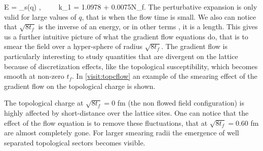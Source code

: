 \beq
    \langle E \rangle =  \alpha_s(q) ,~~~~~k_1 = 1.0978 + 0.0075\times N_f.
    \label{energy_flow}
\eeq
The perturbative expansion is only valid for large values of $q$, that is when the flow time is small. We also can notice that $\sqrt{8t_f}$ is the inverse of an energy, or in other terms , it is a length. This gives us a further intuitive picture of what the gradient flow equations do, that is to smear the field over a hyper-sphere of radius $\sqrt{8t_f}$. The gradient flow is particularly interesting to study quantities that are divergent on the lattice because of discretization effects, like the topological susceptibility, which becomes smooth at non-zero $t_f$. In \cref{visit:topcflow} an example of the smearing effect of the gradient flow on the topological charge is shown.  

The topological charge at $\sqrt{8t_f} = 0$ fm (the non flowed field configuration) is highly affected by short-distance over the lattice sites. One can notice that the effect of the flow equation is to remove these fluctuations, that at $\sqrt{8t_f} = 0.60$ fm are almost completely gone. For larger smearing radii the emergence of well separated topological sectors becomes visible.

